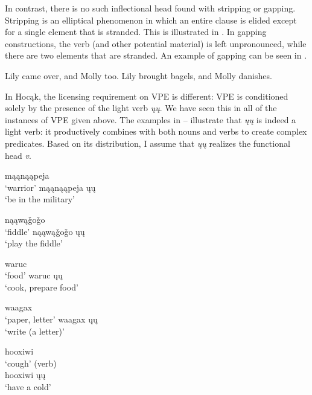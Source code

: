 \documentclass[output=paper]{LSP/langsci}
\begin{document}
In contrast, there is no such inflectional head found with stripping or gapping. Stripping is an elliptical phenomenon in which an entire clause is elided except for a single element that is stranded. This is illustrated in . In gapping constructions, the verb (and other potential material) is left unpronounced, while there are two elements that are stranded. An example of gapping can be seen in .
 
\ea\label{ex:johnson:13}
\ea\label{ex:johnson:13a}
Lily came over, and Molly too.
\ex\label{ex:johnson:13b} 
Lily brought bagels, and Molly danishes.
\z
\z

In Hocąk, the licensing requirement on VPE is different: VPE is conditioned solely by the presence of the light verb \emph{ųų}. We have seen this in all of the instances of VPE given above. The examples in -- illustrate that \emph{ųų} is indeed a light verb: it productively combines with both nouns and verbs to create complex predicates. Based on its distribution, I assume that \emph{ųų} realizes the functional head \emph{v}. \citep[Examples 14--18]{Hartmann2012}
 
\ea\label{ex:johnson:14}
\begin{multicols}{2}
\ea 
mąąnąąpeja\\
`warrior'
\ex 
mąąnąąpeja ųų\\
`be in the military'
\z
\end{multicols}
\z
 
\ea\label{ex:johnson:15}
\begin{multicols}{2}
\ea 
nąąwą\v{g}o\v{g}o\\
`fiddle'
\ex 
nąąwą\v{g}o\v{g}o ųų\\
`play the fiddle'
\z
\end{multicols}
\z
 
\ea\label{ex:johnson:16}
\begin{multicols}{2}
\ea 
waruc\\
`food'
\ex 
waruc ųų\\
`cook, prepare food'
\z
\end{multicols}
\z
 
\ea\label{ex:johnson:17}
\begin{multicols}{2}
\ea 
waagax\\
`paper, letter'
\ex 
waagax ųų\\
`write (a letter)'
\z
\end{multicols}
\z
 
\ea\label{ex:johnson:18}
\begin{multicols}{2}
\ea 
hooxiwi\\
`cough' (verb)\\

\ex 
hooxiwi ųų\\
`have a cold'
\z
\end{multicols}
\z
\end{document}
